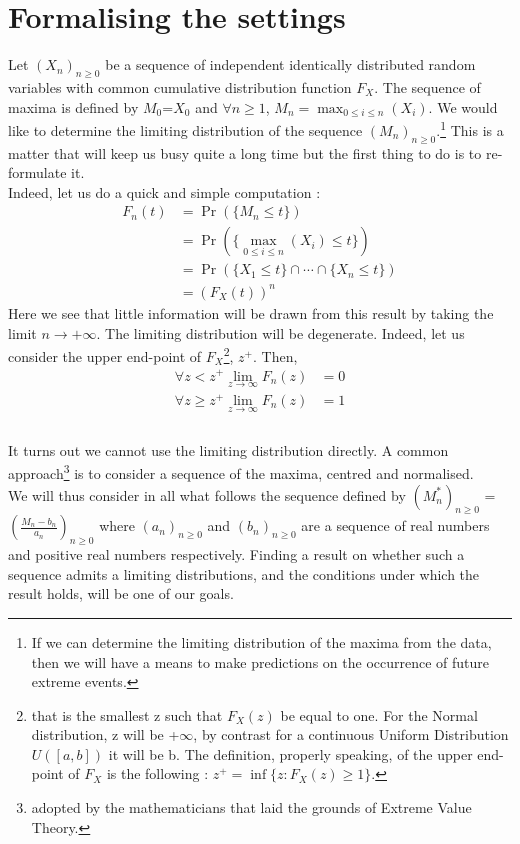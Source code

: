 \section{Formalising the settings}
Let $(X_n)_{n \ge 0}$ be a sequence of independent identically distributed random variables with common cumulative distribution function $F_X$. The sequence of maxima is defined by $M_0$=$X_0$ and $\forall n \ge 1$, $M_n = \max_{0 \le i \le n}(X_i)$. We would like to determine the limiting distribution of the sequence $(M_n)_{n \ge 0}$.\footnote{If we can determine the limiting distribution of the maxima from the data, then we will have a means to make predictions on the occurrence of future extreme events.} This is a matter that will keep us busy quite a long time but the first thing to do is to re-formulate it. \\ [4 pt]
Indeed, let us do a quick and simple computation :\\
\begin{equation}
\begin{aligned}
	F_n(t) &= \Pr(\{M_n \le t\}) \\
              &= \Pr(\{\max_{0 \le i \le n}(X_i) \le t\}) \\
              &= \Pr(\{X_1 \le t\} \cap \cdots \cap \{X_n \le t\}) \\
              &= (F_X(t))^n
\end{aligned}
\end{equation}
Here we see that little information will be drawn from this result by taking the limit $n \longrightarrow +\infty$. The limiting distribution will be degenerate. Indeed, let us consider the upper end-point of $F_X$\footnote{that is the smallest z such that $F_X(z)$ be equal to one. For the Normal distribution, z will be +$\infty$, by contrast for a continuous Uniform Distribution $U([a,b])$ it will be b. The definition, properly speaking, of the upper end-point of $F_X$ is the following : $z^{+} = \inf\{z : F_X(z) \ge 1\}$.}, $z^{+}$. Then,
\begin{equation}
\begin{aligned}
\forall z < z^{+} \lim_{z\to\infty} F_n(z) &= 0 \\
\forall z \ge z^{+} \lim_{z\to\infty} F_n(z) &= 1 \\
\end{aligned}
\end{equation}
\\[4 pt]
It turns out we cannot use the limiting distribution directly. A common approach\footnote{adopted by the mathematicians that laid the grounds of Extreme Value Theory.} is to consider a sequence of the maxima, centred and normalised.\\[4 pt] 
We will thus consider in all what follows the sequence defined by $(M^{*}_n)_{n \ge 0}$ = $(\frac{M_n - b_n}{a_n})_{n \ge 0}$ where $(a_n)_{n \ge 0}$ and $(b_n)_{n \ge 0}$ are a sequence of real numbers and positive real numbers respectively. Finding a result on whether such a sequence admits a limiting distributions, and the conditions under which the result holds, will be one of our goals.
